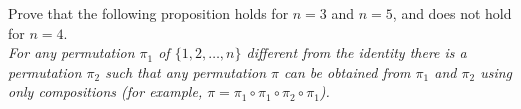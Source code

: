 \documentclass{article}
\begin{document}
	\setlength{\parindent}{0pt}
	Prove that the following proposition holds for $n=3$ and $n=5$, and does not hold for $n=4$.\\
	\textit{For any permutation $\pi_1$ of $\{1,2,\dots,n\}$ different from the identity there is a permutation $\pi_2$ such that any permutation $\pi$ can be obtained from $\pi_1$ and $\pi_2$ using only compositions (for example, $\pi=\pi_1\circ\pi_1\circ\pi_2\circ\pi_1$).}
\end{document}
